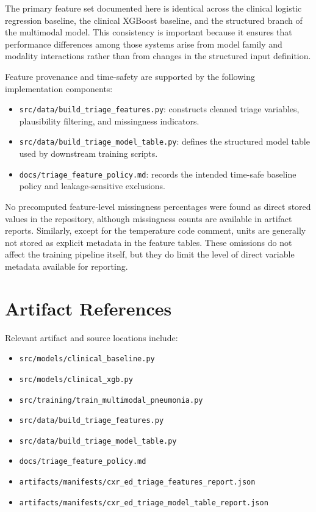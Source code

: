The primary feature set documented here is identical across the clinical logistic regression baseline, the clinical XGBoost baseline, and the structured branch of the multimodal model. This consistency is important because it ensures that performance differences among those systems arise from model family and modality interactions rather than from changes in the structured input definition.

Feature provenance and time-safety are supported by the following implementation components:

\begin{itemize}
    \item \texttt{src/data/build\_triage\_features.py}: constructs cleaned triage variables, plausibility filtering, and missingness indicators.
    \item \texttt{src/data/build\_triage\_model\_table.py}: defines the structured model table used by downstream training scripts.
    \item \texttt{docs/triage\_feature\_policy.md}: records the intended time-safe baseline policy and leakage-sensitive exclusions.
\end{itemize}

No precomputed feature-level missingness percentages were found as direct stored values in the repository, although missingness counts are available in artifact reports. Similarly, except for the temperature code comment, units are generally not stored as explicit metadata in the feature tables. These omissions do not affect the training pipeline itself, but they do limit the level of direct variable metadata available for reporting.

\section{Artifact References}

Relevant artifact and source locations include:

\begin{itemize}
    \item \texttt{src/models/clinical\_baseline.py}
    \item \texttt{src/models/clinical\_xgb.py}
    \item \texttt{src/training/train\_multimodal\_pneumonia.py}
    \item \texttt{src/data/build\_triage\_features.py}
    \item \texttt{src/data/build\_triage\_model\_table.py}
    \item \texttt{docs/triage\_feature\_policy.md}
    \item \texttt{artifacts/manifests/cxr\_ed\_triage\_features\_report.json}
    \item \texttt{artifacts/manifests/cxr\_ed\_triage\_model\_table\_report.json}
\end{itemize}
